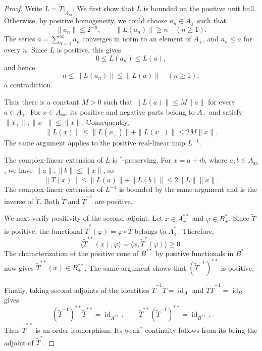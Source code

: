 \documentclass[12pt]{amsart}
\theoremstyle{remark}
\newcommand{\sa}{\mathrm{sa}}
\begin{document}
\begin{proof}
Write $L=\widetilde T|_{A_{\sa}}$.
We first show that $L$ is bounded on the positive unit ball.
Otherwise, by positive homogeneity, we could choose $a_n\in A_+$
such that
\[
    \|a_n\|\le 2^{-n},
    \qquad
    \|L(a_n)\|\ge n
    \quad(n\ge1).
\]
The series $a=\sum_{n=1}^{\infty}a_n$ converges in norm to an
element of $A_+$, and $a_n\le a$ for every $n$.
Since $L$ is positive, this gives
\[
    0\le L(a_n)\le L(a),
\]
and hence
\[
    n\le\|L(a_n)\|\le\|L(a)\|
    \quad(n\ge1),
\]
a contradiction.

Thus there is a constant $M>0$ such that
$\|L(a)\|\le M\|a\|$ for every $a\in A_+$.
For $x\in A_{\sa}$, its positive and negative parts belong to
$A_+$ and satisfy $\|x_+\|,\|x_-\|\le\|x\|$.
Consequently,
\[
    \|L(x)\|
    \le\|L(x_+)\|+\|L(x_-)\|
    \le 2M\|x\|.
\]
The same argument applies to the positive real-linear map $L^{-1}$.

The complex-linear extension of $L$ is $^*$-preserving.
For $x=a+ib$, where $a,b\in A_{\sa}$, we have
$\|a\|,\|b\|\le\|x\|$, so
\[
    \|\widetilde T(x)\|
    \le\|L(a)\|+\|L(b)\|
    \le 2\|L\|\|x\|.
\]
The complex-linear extension of $L^{-1}$ is bounded by the same
argument and is the inverse of $\widetilde T$.
Both $\widetilde T$ and $\widetilde T^{-1}$ are positive.


We next verify positivity of the second adjoint.
Let $x\in A^{**}_+$ and $\varphi\in B^*_+$.
Since $\widetilde T$ is positive, the functional
$\widetilde T^*(\varphi)=\varphi\circ\widetilde T$ belongs to $A^*_+$.
Therefore,
\[
    \langle\widetilde T^{**}(x),\varphi\rangle
    =\langle x,\widetilde T^*(\varphi)\rangle
    \ge0.
\]
The characterization of the positive cone of $B^{**}$ by positive
functionals in $B^*$ now gives
$\widetilde T^{**}(x)\in B^{**}_+$.
The same argument shows that $(\widetilde T^{-1})^{**}$ is positive.


Finally, taking second adjoints of the identities
$\widetilde T^{-1}\widetilde T=\operatorname{id}_A$ and
$\widetilde T\widetilde T^{-1}=\operatorname{id}_B$ gives
\[
    (\widetilde T^{-1})^{**}\widetilde T^{**}
    =\operatorname{id}_{A^{**}},
    \qquad
    \widetilde T^{**}(\widetilde T^{-1})^{**}
    =\operatorname{id}_{B^{**}}.
\]
Thus $\widetilde T^{**}$ is an order isomorphism.
Its weak$^*$ continuity follows from its being the adjoint of
$\widetilde T^*$.
\end{proof}
\end{document}
